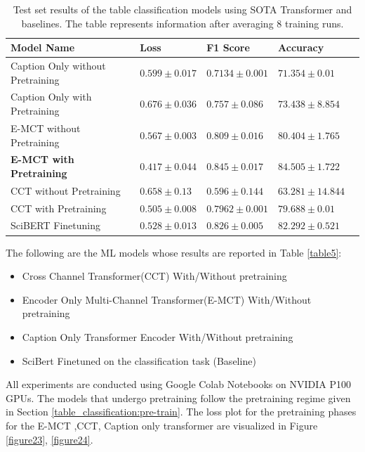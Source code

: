 \begin{table}[h]
    \label{table\arabic{tablecounter}}
    \centering
    \begin{tabular}{llllr}
        \toprule
                         Model Name &                 Loss &             F1 Score &               Accuracy \\
        \midrule
          Caption Only without Pretraining &  $ 0.599 \pm 0.017 $ &    $ 0.7134 \pm 0.001 $ &     $ 71.354 \pm 0.01 $ \\
          Caption Only with Pretraining  &  $ 0.676 \pm 0.036 $ &  $ 0.757 \pm 0.086 $ &   $ 73.438 \pm 8.854 $ \\
          E-MCT without Pretraining &  $ 0.567 \pm 0.003 $ &  $ 0.809 \pm 0.016 $ &   $ 80.404 \pm 1.765 $ \\
          \textbf{E-MCT with Pretraining} &  $ \mathbf{0.417 \pm 0.044} $ &  $ \mathbf{0.845 \pm 0.017}$ &  $\mathbf{84.505 \pm 1.722}$ \\
          CCT without Pretraining &   $ 0.658 \pm 0.13 $ &  $ 0.596 \pm 0.144 $ &  $ 63.281 \pm 14.844 $ \\
          CCT with Pretraining &  $ 0.505 \pm 0.008 $ &    $ 0.7962 \pm 0.001 $ &     $ 79.688 \pm 0.01 $ \\
          SciBERT Finetuning &  $ 0.528 \pm 0.013 $ &  $ 0.826 \pm 0.005 $ &   $ 82.292 \pm 0.521 $ \\
        \bottomrule
    \end{tabular}
    \caption{Test set results of the table classification models using SOTA Transformer and baselines. The table represents information after averaging 8 training runs. }
\end{table}

The following are the ML models whose results are reported in Table \ref{table5}:
\begin{itemize}
    \item Cross Channel Transformer(CCT) With/Without pretraining
    \item Encoder Only Multi-Channel Transformer(E-MCT) With/Without pretraining
    \item Caption Only Transformer Encoder With/Without pretraining
    \item SciBert Finetuned on the classification task (Baseline)
\end{itemize}
All experiments are conducted using Google Colab Notebooks on NVIDIA P100 GPUs. The models that undergo pretraining follow the pretraining regime given in Section \ref{table_classification:pre-train}. The loss plot for the pretraining phases for the E-MCT ,CCT, Caption only transformer are visualized in Figure \ref{figure23}, \ref{figure24}. 


